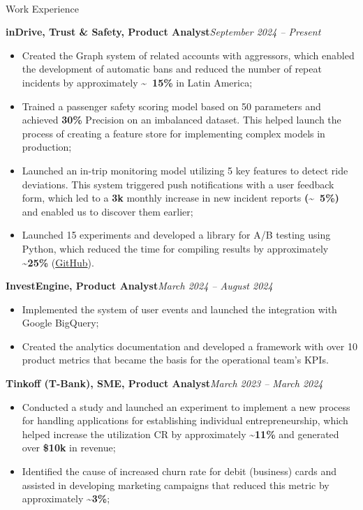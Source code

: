 \documentclass[]{mcdowellcv}
\renewenvironment{cvsubsection}[2]{%
  \begin{adjustwidth}{\subsectionmargin}{\subsectionmargin}%
    {\bfseries #1}\hfill #2\par\vspace{0.5em}%
}{%
  \end{adjustwidth}%
  \vspace*{\aftersubsectionspace}%
}
\renewcommand{\makeheader}{%
  \begin{center}
    \printname\\[0.5em]%
    \printcontacts%
  \end{center}%
  \vspace*{\afterheaderspace}%
}
\begin{document}
	\makeheader
	
	\begin{cvsection}{\Large Work Experience}
		\begin{cvsubsection}{inDrive, Trust \& Safety, Product Analyst}{\textit{September 2024 -- Present}}
			\begin{itemize}
				\item Created the Graph system of related accounts with aggressors, which enabled the development of automatic bans and reduced the number of repeat incidents by approximately \textbf{\textasciitilde ~15\%} in Latin America;
				\item Trained a passenger safety scoring model based on 50 parameters and achieved \textbf{30\%} Precision on an imbalanced dataset. This helped launch the process of creating a feature store for implementing complex models in production;
				\item Launched an in-trip monitoring model utilizing 5 key features to detect ride deviations. This system triggered push notifications with a user feedback form, which led to a \textbf{3k} monthly increase in new incident reports \textbf{(\textasciitilde ~5\%)} and enabled us to discover them earlier;
				\item Launched 15 experiments and developed a library for A/B testing using Python, which reduced the time for compiling results by approximately \textbf{\textasciitilde 25\%} (\href{https://github.com/Renarion/expab}{GitHub}).
			\end{itemize}
		\end{cvsubsection}
		
		\begin{cvsubsection}{InvestEngine, Product Analyst}{\textit{March 2024 -- August 2024}}
			\begin{itemize}
				\item Implemented the system of user events and launched the integration with Google BigQuery;
				\item Created the analytics documentation and developed a framework with over 10 product metrics that became the basis for the operational team's KPIs.
			\end{itemize}
		\end{cvsubsection}
		
		\begin{cvsubsection}{Tinkoff (T-Bank), SME, Product Analyst}{\textit{March 2023 -- March 2024}}
			\begin{itemize}
				\item Conducted a study and launched an experiment to implement a new process for handling applications for establishing individual entrepreneurship, which helped increase the utilization CR by approximately \textbf{\textasciitilde 11\%} and generated over \textbf{\$10k} in revenue;
				\item Identified the cause of increased churn rate for debit (business) cards and assisted in developing marketing campaigns that reduced this metric by approximately \textbf{\textasciitilde 3\%};
			\end{itemize}
		\end{cvsubsection}
		

\end{cvsection}
\end{document}
